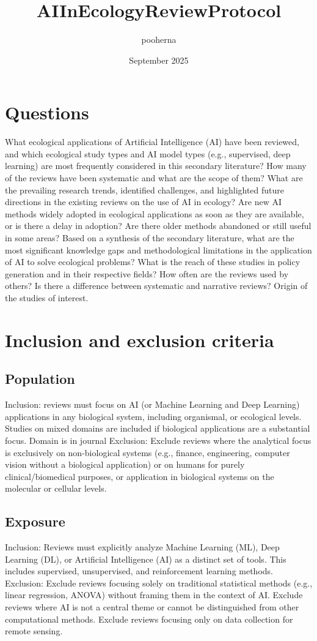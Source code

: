 \documentclass{article}
\title{AIInEcologyReviewProtocol}
\author{pooherna }
\date{September 2025}
\begin{document}
\maketitle

\section{Questions}
What ecological applications of Artificial Intelligence (AI) have been reviewed, and which ecological study types and AI model types (e.g., supervised, deep learning) are most frequently considered in this secondary literature?
How many of the reviews have been systematic and what are the scope of them?
What are the prevailing research trends, identified challenges, and highlighted future directions in the existing reviews on the use of AI in ecology? 
Are new AI methods widely adopted in ecological applications as soon as they are available, or is there a delay in adoption?
Are there older methods abandoned or still useful in some areas?
Based on a synthesis of the secondary literature, what are the most significant knowledge gaps and methodological limitations in the application of AI to solve ecological problems?
What is the reach of these studies in policy generation and in their respective fields?
How often are the reviews used by others?
Is there a difference between systematic and narrative reviews?
Origin of the studies of interest.

\section{Inclusion and exclusion criteria}
\subsection{Population}
Inclusion: reviews must focus on AI (or Machine Learning and Deep Learning) applications in any biological system, including organismal, or ecological levels. Studies on mixed domains are included if biological applications are a substantial focus. Domain is in journal
Exclusion: Exclude reviews where the analytical focus is exclusively on non-biological systems (e.g., finance, engineering, computer vision without a biological application) or on humans for purely clinical/biomedical purposes, or application in biological systems on the molecular or cellular levels.

\subsection{Exposure}
Inclusion: Reviews must explicitly analyze Machine Learning (ML), Deep Learning (DL), or Artificial Intelligence (AI) as a distinct set of tools. This includes supervised, unsupervised, and reinforcement learning methods.
Exclusion: Exclude reviews focusing solely on traditional statistical methods (e.g., linear regression, ANOVA) without framing them in the context of AI. Exclude reviews where AI is not a central theme or cannot be distinguished from other computational methods. Exclude reviews focusing only on data collection for remote sensing.
\end{document}
